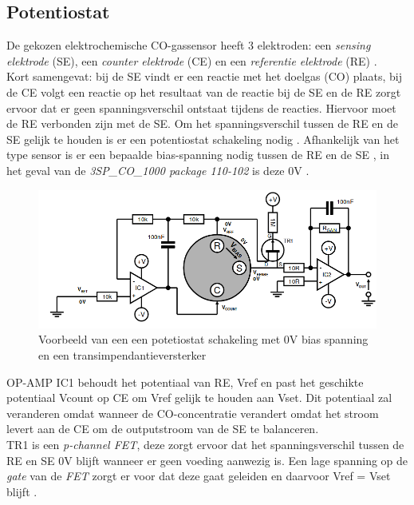 \documentclass[a4paper, 11pt]{article} %
\begin{document}
	\subsection{Potentiostat} \label{subsec::potentiostat}
	De gekozen elektrochemische CO-gassensor heeft 3 elektroden: een \textit{sensing elektrode} (SE), een \textit{counter elektrode} (CE) en een \textit{referentie elektrode} (RE) \cite{datasheet sensor}.
	\\ Kort samengevat: bij de SE vindt er een reactie met het doelgas (CO) plaats, bij de CE volgt een reactie op het resultaat van de reactie bij de SE en de RE zorgt ervoor dat er geen spanningsverschil ontstaat tijdens de reacties. Hiervoor moet de RE verbonden zijn met de SE. Om het spanningsverschil tussen de RE en de SE gelijk te houden is er een potentiostat schakeling nodig \cite{datasheet sensor}. Afhankelijk van het type sensor is er een bepaalde bias-spanning nodig tussen de RE en de SE \cite{SGX Application note}, in het geval van de \textit{3SP\_CO\_1000 package 110-102} is deze 0V \cite{datasheet sensor}.
	\begin{figure}[h!]
		\centering
		\hspace*{-3cm} 
		\includegraphics[width=1.4\linewidth]{../Media/unbiasedSensorCircuit.png}
		\caption{Voorbeeld van een een potetiostat schakeling met 0V bias spanning en een transimpendantieversterker \cite{SGX Application note}}
		\label{fig::EG_schakeling}
	\end{figure}
	\newpage
	OP-AMP IC1 behoudt het potentiaal van RE, V{\small ref} en past het geschikte potentiaal V{\small count} op CE om V{\small ref} gelijk te houden aan V{\small set}. Dit potentiaal zal veranderen omdat wanneer de CO-concentratie verandert omdat het stroom levert aan de CE om de outputstroom van de SE te balanceren. \\
	TR1 is een \textit{p-channel FET}, deze zorgt ervoor dat het spanningsverschil tussen de RE en SE 0V blijft wanneer er geen voeding aanwezig is. Een lage spanning op de \textit{gate} van de \textit{FET} zorgt er voor dat deze gaat geleiden en daarvoor V{\small ref} = V{\small set} blijft \cite{SGX Application note}.
	
\end{document}

